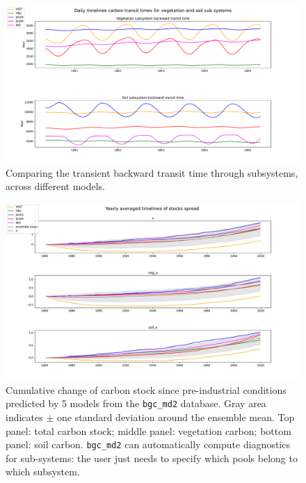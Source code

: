 \begin{figure}[t] \includegraphics[width=\columnwidth]{test_veg_soil.pdf}
  \caption{
    Comparing the transient backward transit time through
    subsystems, across different models. 
  } 
  \label{fig:btt_4models} 
\end{figure}  

\begin{figure}[t] \includegraphics[width=\columnwidth]{test_stock_mean.pdf}
  \caption{
    Cumulative change of carbon %
    stock since pre-industrial conditions predicted by 5 models from the \texttt{bgc\_md2} database. Gray area indicates $\pm$ one standard deviation around the ensemble mean.
    Top panel: total carbon stock; middle panel: vegetation carbon; bottom panel: soil carbon.  \texttt{bgc\_md2} can automatically compute diagnostics for sub-systems: the user just needs to specify which pools
    belong to which subsystem. 
  }
  \label{fig:stock_mean} 
\end{figure}  



